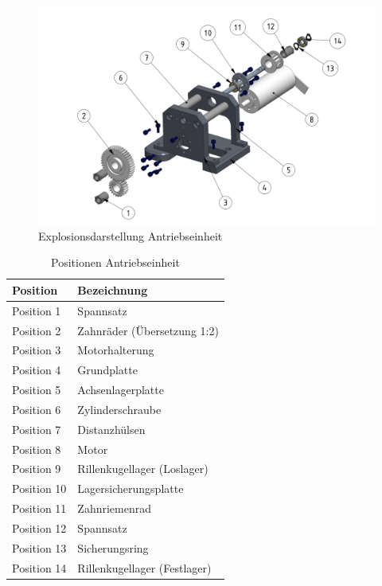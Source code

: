 \documentclass[../../main.tex]{subfiles}
\begin{document}
    \begin{figure}[H] %
        \centering
        \includegraphics[width=1\textwidth]{antriebseinheit.png}
        \caption{Explosionsdarstellung Antriebseinheit}
        \label{fig:antriebseinheit}
    \end{figure}

    \begin{table}[H] \centering
        \begin{tabular}{|l|l|}
        \hline
        \textbf{Position} & \textbf{Bezeichnung}\\
        \hline
        Position 1          & Spannsatz\\
         \hline
        Position 2          & Zahnräder (Übersetzung 1:2)\\
        \hline
        Position 3          & Motorhalterung\\
        \hline
        Position 4          & Grundplatte\\
        \hline
        Position 5          & Achsenlagerplatte\\
        \hline
        Position 6          & Zylinderschraube\\
        \hline
        Position 7          & Distanzhülsen\\
        \hline
        Position 8          & Motor\\
        \hline
        Position 9          & Rillenkugellager (Loslager)\\
        \hline
        Position 10         & Lagersicherungsplatte\\
        \hline
        Position 11         & Zahnriemenrad\\
        \hline
        Position 12         & Spannsatz\\
        \hline
        Position 13         & Sicherungsring\\
        \hline
        Position 14         & Rillenkugellager (Festlager)\\
        \hline
        \end{tabular}

        \caption{Positionen Antriebseinheit}
        \label{tab:pos_antriebseinheit}
        \end{table}
\end{document}
